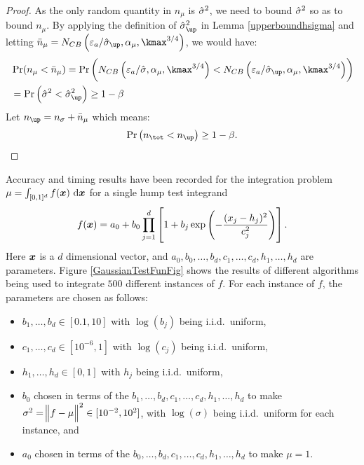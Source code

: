 \documentclass{iitthesis}
\begin{document}
\begin{proof}
As the only random quantity in $n_\mu$ is $\hat{\sigma}^2$, we need to bound $\hat{\sigma}^2$ so as  to bound $n_{\mu}$.
 By applying the definition of $\hsigma_{\up}^2$ in Lemma \ref{upperboundhsigma} and letting $\bar{n}_{\mu} = N_{CB}\left(\varepsilon_a/\hsigma_{\up},\alpha_\mu, \kmax^{3/4}\right)$, we would have:
\begin{align}
& \Pr(n_{\mu} < \bar{n}_{\mu})  = \Pr\left (N_{CB}\left(\varepsilon_a/\hsigma,\alpha_\mu, \kmax^{3/4}\right) < N_{CB}\left(\varepsilon_a/\hsigma_{\up},\alpha_\mu, \kmax^{3/4}\right) \right)\\&
 = \Pr \left(\hsigma^2 < \hsigma_{\up}^2 \right) \geq 1-\beta
\end{align}
Let $n_{\up} =n_\sigma+\bar{n}_{\mu} $
which means:
\begin{align}
\Pr \left(n_{\tot} < n_{\up}\right)  \geq 1-\beta.
\end{align}
\end{proof}
Accuracy and timing results have been recorded for the integration problem $\mu=\int_{[0,1]^d} f(\vx) \, \dif \vx$ for a single hump test integrand
\begin{equation} \label{GaussianTestFun}
f(\boldsymbol{x})=a_0 + b_0\prod_{j=1}^d\left[ 1 +b_j \exp \left(-\frac{(x_j-h_j)^2}{c_j^2}\right) \right].
\end{equation}
Here $\boldsymbol{x}$ is a $d$ dimensional vector, and $a_0, b_0, \ldots, b_d, c_1, \ldots, c_d, h_1, \ldots, h_d$ are parameters. Figure \ref{GaussianTestFunFig} shows the results of different algorithms being used to integrate $500$ different instances of $f$.  For each instance of $f$, the parameters are chosen as follows:
\begin{itemize} 
\item $b_1, \ldots, b_d \in [0.1,10]$ with $\log(b_j)$ being i.i.d.\ uniform,
\item $c_1, \ldots, c_d \in [10^{-6},1]$ with $\log(c_j)$ being i.i.d.\ uniform,
\item $h_1, \ldots, h_d \in [0,1]$ with $h_j$ being i.i.d.\ uniform,
\item $b_0$ chosen in terms of the $b_1, \ldots, b_d, c_1, \ldots, c_d, h_1, \ldots, h_d$ to make $\sigma^2 =\norm[2]{f-\mu}^2 \in [10^{-2}, 10^2]$, with $\log(\sigma)$ being i.i.d.\ uniform for each instance, and
\item $a_0$ chosen in terms of the $b_0, \ldots, b_d, c_1, \ldots, c_d, h_1, \ldots, h_d$ to make $\mu=1$.
\end{itemize}
\end{document}
